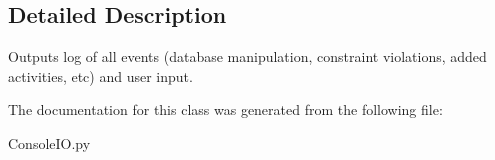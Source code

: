 \subsection{Detailed Description}
Outputs log of all events (database manipulation, constraint violations, added activities, etc) and user input. 



The documentation for this class was generated from the following file\-:\begin{DoxyCompactItemize}
\item 
Console\-I\-O.\-py\end{DoxyCompactItemize}
